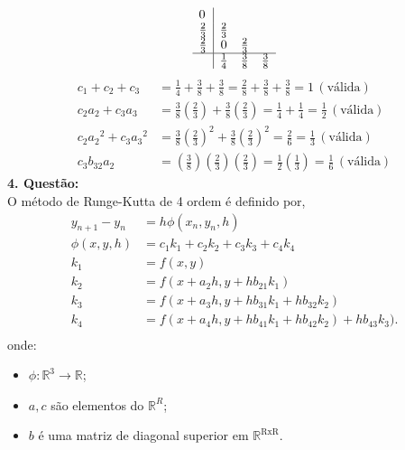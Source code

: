 \documentclass[a4paper,12pt]{article}
\begin{document}
{\arraycolsep=3.4pt\def\arraystretch{1.4}
\[
	\begin{array}{l|ccc} 
		0 &  & & \\
		\frac{2}{3} & \frac{2}{3} & & \\
		\frac{2}{3} & 0 & \frac{2}{3}& \\
		\hline
		&\frac{1}{4} & \frac{3}{8} & \frac{3}{8}
	\end{array}
\]
}
\begin{align*}
	c_1 + c_2 + c_3 &= \frac{1}{4} + \frac{3}{8} + \frac{3}{8} = \frac{2}{8} + \frac{3}{8} + \frac{3}{8} = 1 \hspace{2pt}(\textrm{v\'alida})\\
	c_2 a_2 + c_3 a_3 &= \frac{3}{8}\left (\frac{2}{3} \right) + \frac{3}{8} \left (\frac{2}{3} \right ) =
	\frac{1}{4} + \frac{1}{4} = \frac{1}{2} \hspace{2pt}(\textrm{v\'alida})\\
	c_2 {a_2}^{2} + c_3 {a_3}^{2}&= \frac{3}{8} \left ( \frac{2}{3}\right )^{2} +  \frac{3}{8} \left ( \frac{2}{3}\right )^{2} =
	\frac{2}{6} = \frac{1}{3}\hspace{2pt}(\textrm{v\'alida})\\ 
	c_3 b_{32} a_2 &=\left (\frac{3}{8}\right )\left (\frac{2}{3}\right )\left (\frac{2}{3}\right ) =
	\frac{1}{2}\left ( \frac{1}{3}\right ) = \frac{1}{6}\hspace{2pt}(\textrm{v\'alida})
\end{align*}
\newpage
\textbf{4. Quest\~ao:}\\
O m\'etodo de Runge-Kutta de 4 ordem \'e definido por,
\begin{align*}
	y_{n+1} - y_{n} &= h\phi(x_{n},y_{n},h)\\
	\phi (x,y,h) &= {c_1}{k_1} + {c_2}{k_2} + {c_3}{k_3} + {c_4}{k_4} \\
	k_1 &= f(x,y)\\ 
	k_2 &= f(x + a_2 h,y + hb_{21}{k_1})\\ 
	k_3 &= f(x + a_3 h,y + hb_{31}{k_1} + hb_{32}{k_2})\\ 
	k_4 &= f(x + a_4 h,y + hb_{41}{k_1} + hb_{42}{k_2}) + hb_{43}{k_3}) .\\ 
\end{align*}
onde:\\
\begin{itemize}
	\item $\phi :\mathbb{R}^{3} \rightarrow \mathbb{R}$;
	\item $a,c$ s\~ao elementos do $\mathbb{R}^{R}$; 
	\item $b$ \'e uma matriz de diagonal superior em $\mathbb{R}^{\mathrm{RxR}}$.
\end{itemize}
\end{document}
